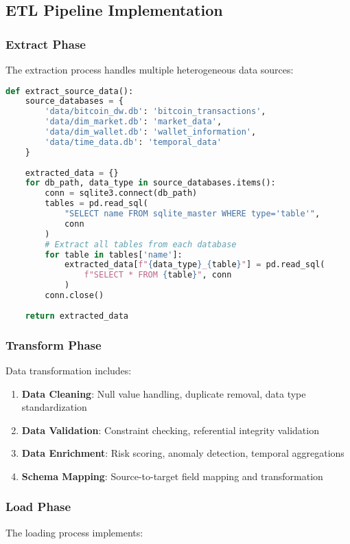 \documentclass[12pt,a4paper]{article}
\begin{document}
\subsection{ETL Pipeline Implementation}

\subsubsection{Extract Phase}
The extraction process handles multiple heterogeneous data sources:

\begin{lstlisting}[language=Python]
def extract_source_data():
    source_databases = {
        'data/bitcoin_dw.db': 'bitcoin_transactions',
        'data/dim_market.db': 'market_data',
        'data/dim_wallet.db': 'wallet_information',
        'data/time_data.db': 'temporal_data'
    }
    
    extracted_data = {}
    for db_path, data_type in source_databases.items():
        conn = sqlite3.connect(db_path)
        tables = pd.read_sql(
            "SELECT name FROM sqlite_master WHERE type='table'", 
            conn
        )
        # Extract all tables from each database
        for table in tables['name']:
            extracted_data[f"{data_type}_{table}"] = pd.read_sql(
                f"SELECT * FROM {table}", conn
            )
        conn.close()
    
    return extracted_data
\end{lstlisting}

\subsubsection{Transform Phase}
Data transformation includes:

\begin{enumerate}
    \item \textbf{Data Cleaning}: Null value handling, duplicate removal, data type standardization
    \item \textbf{Data Validation}: Constraint checking, referential integrity validation
    \item \textbf{Data Enrichment}: Risk scoring, anomaly detection, temporal aggregations
    \item \textbf{Schema Mapping}: Source-to-target field mapping and transformation
\end{enumerate}

\subsubsection{Load Phase}
The loading process implements:
\end{document}
